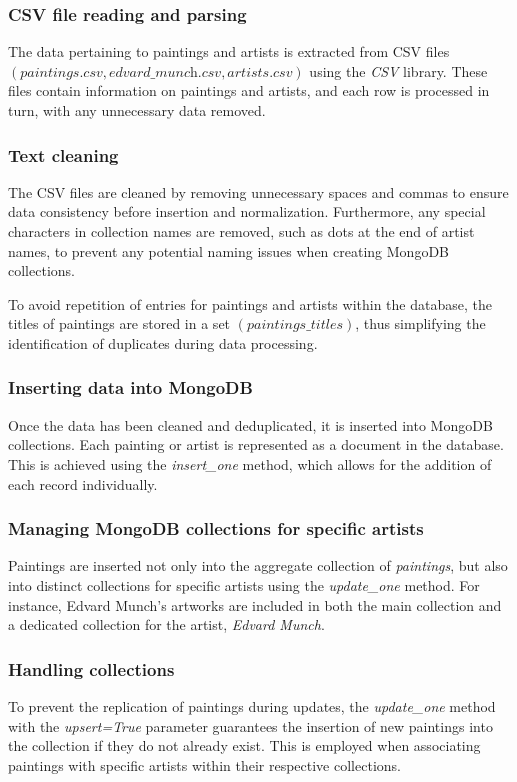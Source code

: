\documentclass[a4paper,12pt]{article}
\begin{document}
\subsubsection{CSV file reading and parsing}
The data pertaining to paintings and artists is extracted from CSV files $\left(\textit{paintings.csv}, \textit{edvard\_munch.csv}, \textit{artists.csv}\right)$ using the \textit{CSV} library. These files contain information on paintings and artists, and each row is processed in turn, with any unnecessary data removed.

\subsubsection{Text cleaning}
The CSV files are cleaned by removing unnecessary spaces and commas to ensure data consistency before insertion and normalization. Furthermore, any special characters in collection names are removed, such as dots at the end of artist names, to prevent any potential naming issues when creating MongoDB collections.

To avoid repetition of entries for paintings and artists within the database, the titles of paintings are stored in a set $\left(\textit{paintings\_titles}\right)$, thus simplifying the identification of duplicates during data processing.

\subsubsection{Inserting data into MongoDB}
Once the data has been cleaned and deduplicated, it is inserted into MongoDB collections. Each painting or artist is represented as a document in the database. This is achieved using the \textit{insert\_one} method, which allows for the addition of each record individually.

\subsubsection{Managing MongoDB collections for specific artists}
Paintings are inserted not only into the aggregate collection of \textit{paintings}, but also into distinct collections for specific artists using the \textit{update\_one} method. For instance, Edvard Munch's artworks are included in both the main collection and a dedicated collection for the artist, \textit{Edvard Munch}.

\subsubsection{Handling collections}
To prevent the replication of paintings during updates, the \textit{update\_one} method with the \textit{upsert=True} parameter guarantees the insertion of new paintings into the collection if they do not already exist. This is employed when associating paintings with specific artists within their respective collections.
\end{document}
